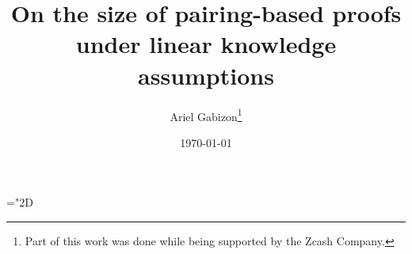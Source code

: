\documentclass[11pt]{article}
\title{%
On the size of pairing-based proofs under linear knowledge assumptions}
\date{\today}
\author{Ariel Gabizon\thanks{Part of this work was done while being supported by the Zcash Company.}}
\date{}
\numberwithin{figure}{section} %
\newcommand{\set}[1]{\ensuremath{\left\{#1\right\}}\xspace}
\begin{document}
\maketitle
 \mathchardef\mhyphen="2D

\newcommand{\G}{\ensuremath{{\mathbb G}}\xspace}
\newcommand{\Gstar}{\ensuremath{{\mathbb G}^*}\xspace}

\newcommand{\grouppair}{\ensuremath{G^*}\xspace}

\newcommand{\Gt}{\ensuremath{{\mathbb G}_t}\xspace}
\newcommand{\F}{\ensuremath{\mathbb F}\xspace}
\newcommand{\Fstar}{\ensuremath{\mathbb F^*}\xspace}

\newcommand{\help}[1]{$#1$-helper\xspace}
\newcommand{\randompair}[1]{\ensuremath{\mathsf{randomPair}(#1)}\xspace}
\newcommand{\pair}[1]{$#1$-pair\xspace}
\newcommand{\pairs}[1]{$#1$-pairs\xspace}

\newcommand{\pairone}[1]{\G1-$#1$-pair\xspace}
\newcommand{\pairtwo}[1]{\G2-$#1$-pair\xspace}
\newcommand{\sameratio}[2]{\ensuremath{\mathsf{SameRatio}(#1,#2)}\xspace}
\newcommand{\vecc}[2]{\ensuremath{(#1)_{#2}}\xspace}
\newcommand{\players}{\ensuremath{[n]}\xspace}
\newcommand{\adv}{\ensuremath{A}\xspace}
\newcommand{\advprime}{\ensuremath{A'}\xspace}
\newcommand{\extprime}{\ensuremath{E'}\xspace}
\newcommand{\advrand}{\ensuremath{\mathsf{rand}_{\adv}}\xspace}

\newcommand{\ci}{\ensuremath{\mathrm{CI}}\xspace}
\newcommand{\pairvec}[1]{$#1$-vector\xspace}
\newcommand{\Fq}{\ensuremath{\mathbb{F}_q}\xspace}
\newcommand{\randpair}[1]{\ensuremath{\mathsf{rp}_{#1}}\xspace}
\newcommand{\randpairone}[1]{\ensuremath{\mathsf{rp}_{#1}^{1}}\xspace}
\newcommand{\abase}{\ensuremath{A_{\mathrm{\mathbf{0}}}}\xspace}
\newcommand{\bbase}{\ensuremath{B_{\mathrm{\mathbf{0}}}}\xspace}
\newcommand{\cbase}{\ensuremath{C_{\mathrm{\mathbf{0}}}}\xspace}

\newcommand{\amid}{\ensuremath{A_{\mathrm{mid}}}\xspace}
\newcommand{\bmid}{\ensuremath{B_{\mathrm{mid}}}\xspace}
\newcommand{\cmid}{\ensuremath{C_{\mathrm{mid}}}\xspace}

\newcommand{\negl}{\ensuremath{\mathsf{negl}(\lambda)}\xspace}
\newcommand{\randpairtwo}[1]{\ensuremath{\mathsf{rp_{#1}^2}}\xspace}%
\newcommand{\nilp}{\ensuremath{\mathscr N}\xspace}
\newcommand{\snark}{\ensuremath{\mathscr S}\xspace}
\end{document}
